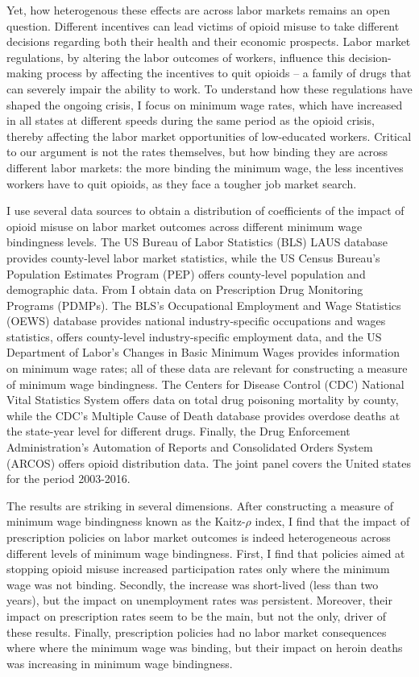 \documentclass[12pt,a4paper]{article}
\begin{document}
Yet, how heterogenous these effects are across labor markets remains an open question.
Different incentives can lead victims of opioid misuse to take different decisions regarding both their health and their economic prospects. 
Labor market regulations, by altering the labor outcomes of workers, influence this decision-making process by affecting the incentives to quit opioids -- a family of drugs that can severely impair the ability to work.
To understand how these regulations have shaped the ongoing crisis, I focus on minimum wage rates, which have increased in all states at different speeds during the same period as the opioid crisis, thereby affecting the labor market opportunities of low-educated workers.
Critical to our argument is not the rates themselves, but how binding they are across different labor markets: the more binding the minimum wage, the less incentives workers have to quit opioids, as they face a tougher job market search.

I use several data sources to obtain a distribution of coefficients of the impact of opioid misuse on labor market outcomes across different minimum wage bindingness levels.
The US Bureau of Labor Statistics (BLS) LAUS database provides county-level labor market statistics, while the US Census Bureau's Population Estimates Program (PEP) offers county-level population and demographic data.
From \textcite{Horwitz2021} I obtain data on Prescription Drug Monitoring Programs (PDMPs). 
The BLS's Occupational Employment and Wage Statistics (OEWS) database provides national industry-specific occupations and wages statistics, \textcite{Eckert2020} offers county-level industry-specific employment data, and the US Department of Labor's Changes in Basic Minimum Wages provides information on minimum wage rates; all of these data are relevant for constructing a measure of minimum wage bindingness.
The Centers for Disease Control (CDC) National Vital Statistics System offers data on total drug poisoning mortality by county, while the CDC's Multiple Cause of Death database provides overdose deaths at the state-year level for different drugs.
Finally, the Drug Enforcement Administration's Automation of Reports and Consolidated Orders System (ARCOS) offers opioid distribution data.
The joint panel covers the United states for the period 2003-2016.

The results are striking in several dimensions.
After constructing a measure of minimum wage bindingness known as the Kaitz-\(\rho\) index, I find that the impact of prescription policies on labor market outcomes is indeed heterogeneous across different levels of minimum wage bindingness.
First, I find that policies aimed at stopping opioid misuse increased participation rates only where the minimum wage was not binding.
Secondly, the increase was short-lived (less than two years), but the impact on unemployment rates was persistent.
Moreover, their impact on prescription rates seem to be the main, but not the only, driver of these results.
Finally, prescription policies had no labor market consequences where where the minimum wage was binding, but their impact on heroin deaths was increasing in minimum wage bindingness.
\end{document}
